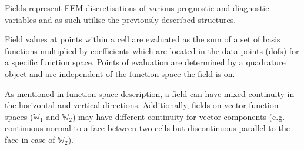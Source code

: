 \documentclass{report}
\begin{document}
Fields represent FEM discretisations of various prognostic and diagnostic variables
and as such utilise the previously described structures.

Field values at points within a cell are evaluated as the sum of a set of basis functions 
multiplied by coefficients which are located in the data points (dofs) for a specific 
function space. Points of evaluation are determined by a quadrature object and are 
independent of the function space the field is on.

As mentioned in function space description, a field can have mixed continuity in the
horizontal and vertical directions. Additionally, fields on vector function spaces 
($\mathbb{W}_{1}$ and $\mathbb{W}_{2}$) may have different continuity for vector 
components (e.g. continuous normal to a face between two cells but discontinuous 
parallel to the face in case of $\mathbb{W}_{2}$).
\end{document}
